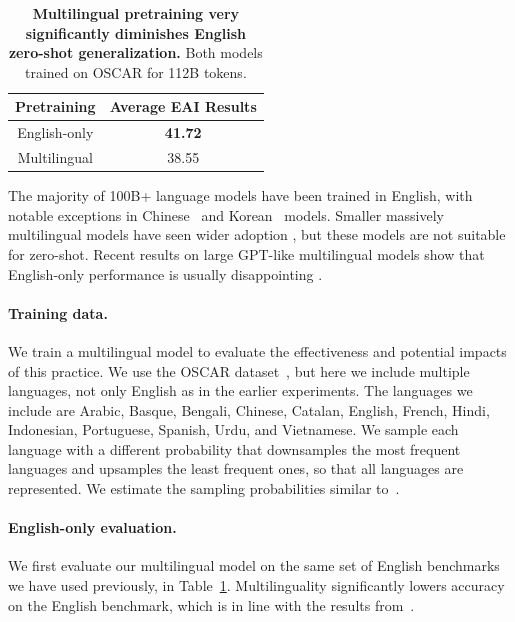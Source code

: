 \begin{table}[b]
\begin{center}
\begin{tabular}{@{}cc@{}}
\toprule
\textbf{Pretraining} & \textbf{Average EAI Results}\\
\midrule
English-only  & \textbf{41.72}\\
Multilingual  & 38.55\\
\bottomrule
\end{tabular}
\end{center}
\caption{\textbf{Multilingual pretraining very significantly diminishes English zero-shot generalization.} Both models trained on OSCAR for 112B tokens.}
\label{tab:mutlilingual}
\end{table}




The majority of 100B+ language models have been trained in English, with notable exceptions in Chinese~\citep{zeng2021pangu, wu2021yuan} and Korean~\cite{Kim2021WhatCC} models. Smaller massively multilingual models have seen wider adoption \cite{mT5}, but these models are not suitable for zero-shot. Recent results on large GPT-like multilingual models show that English-only performance is usually disappointing \cite{XGLM}. 

\paragraph{Training data.}
We train a multilingual model to evaluate the effectiveness and potential impacts of this practice. 
We use the OSCAR dataset~\citep{ortiz2019oscar}, but here we include multiple languages, not only English as in the earlier experiments. 
The languages we include are Arabic, Basque, Bengali, Chinese, Catalan, English, French, Hindi, Indonesian, Portuguese, Spanish, Urdu, and Vietnamese.
We sample each language with a different probability that downsamples the most frequent languages 
and upsamples the least frequent ones, so that all languages 
are represented. We estimate the sampling probabilities similar to~\citet{Xue2021mT5AM}.




\paragraph{English-only evaluation.}
We first evaluate our multilingual model on the same set of English benchmarks we have used previously, in Table~\ref{tab:mutlilingual}. Multilinguality significantly lowers accuracy on the English benchmark, which is in line with the results from~\citet{XGLM}. 

